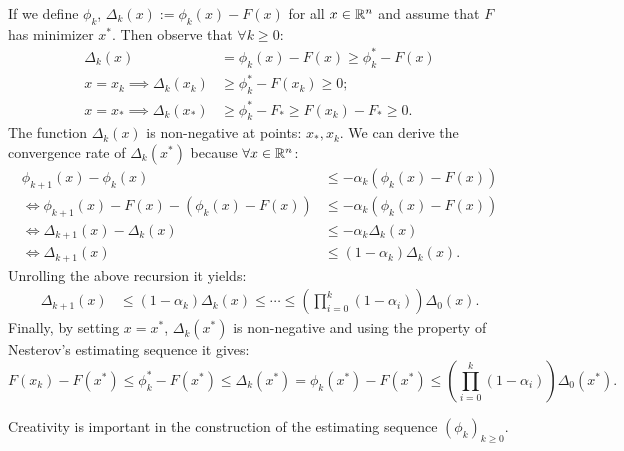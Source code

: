 \documentclass[12pt]{article}
\begin{document}
        \begin{observation} 
            If we define $\phi_k$, $\Delta_k(x) := \phi_k (x) - F(x)$ for all $x \in \mathbb R^n$ and assume that $F$ has minimizer $x^*$. 
            Then observe that $\forall k \ge 0$:  
            \begin{align*}
                \Delta_k(x) 
                &= \phi_k(x) - F(x) \ge \phi_k^* - F(x)
                \\
                x = x_k\implies 
                \Delta_k(x_k) 
                &\ge 
                \phi_k^* - F(x_k) \ge 0;
                \\
                x = x_* \implies 
                \Delta_k(x_*)
                &\ge \phi_k^* - F_* \ge F(x_k) - F_* \ge 0. 
            \end{align*}
            The function $\Delta_k(x)$ is non-negative at points: $x_*, x_k$.
            We can derive the convergence rate of $\Delta_k(x^*)$ because $\forall x \in \mathbb R^n$: 
            \begin{align*}
                \phi_{k + 1}(x) - \phi_k(x) 
                &\le - \alpha_k (\phi_k(x) - F(x))
                \\
                \iff 
                \phi_{k + 1}(x) - F(x) - (\phi_k(x) - F(x))
                &\le 
                -\alpha_k(\phi_k(x) - F(x))
                \\
                \iff
                \Delta_{k + 1}(x) - \Delta_k(x) &\le
                - \alpha_k\Delta_k(x)
                \\
                \iff 
                \Delta_{k + 1}(x) 
                &\le 
                (1 - \alpha_k)\Delta_k(x). 
            \end{align*}
            Unrolling the above recursion it yields: 
            \begin{align*}
                \Delta_{k + 1}(x) &\le 
                (1 - \alpha_k)\Delta_k(x) \le \cdots \le 
                \left(
                    \prod_{i = 0}^k(1 - \alpha_i)
                \right)\Delta_0(x). 
            \end{align*}
            Finally, by setting $x = x^*$, $\Delta_k(x^*)$ is non-negative and using the property of Nesterov's estimating sequence it gives: 
            $$
                F(x_k) - F(x^*) \le \phi_k^* - F(x^*) \le \Delta_k(x^*) = \phi_k(x^*) - F(x^*) \le \left(\prod_{i = 0}^k(1 - \alpha_i)\right)\Delta_0(x^*).
            $$ 
        \end{observation}
        Creativity is important in the construction of the estimating sequence $(\phi_k)_{k \ge 0}$. 
\end{document}
